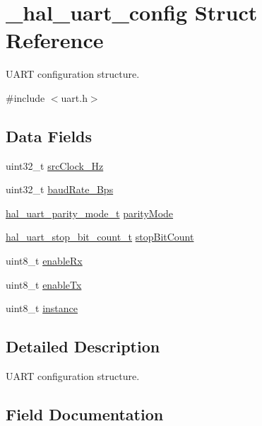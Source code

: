 \hypertarget{struct__hal__uart__config}{}\section{\+\_\+hal\+\_\+uart\+\_\+config Struct Reference}
\label{struct__hal__uart__config}


U\+A\+RT configuration structure.  




{\ttfamily \#include $<$uart.\+h$>$}

\subsection*{Data Fields}
\begin{DoxyCompactItemize}
\item 
uint32\+\_\+t \mbox{\hyperlink{struct__hal__uart__config_a91ed494cee19d1629ac4e017ce45ddbb}{src\+Clock\+\_\+\+Hz}}
\item 
uint32\+\_\+t \mbox{\hyperlink{struct__hal__uart__config_aa5df547b4cb95d3c959373cf6fa672b5}{baud\+Rate\+\_\+\+Bps}}
\item 
\mbox{\hyperlink{group___u_a_r_t___adapter_ga24029165f252c4fe925cdb8af52b3b8f}{hal\+\_\+uart\+\_\+parity\+\_\+mode\+\_\+t}} \mbox{\hyperlink{struct__hal__uart__config_acbc3e2332cc7a0602c77932e67db0b6f}{parity\+Mode}}
\item 
\mbox{\hyperlink{group___u_a_r_t___adapter_gad0fc800e49978f5aee5c162009b16bdb}{hal\+\_\+uart\+\_\+stop\+\_\+bit\+\_\+count\+\_\+t}} \mbox{\hyperlink{struct__hal__uart__config_a9cd9931237993b857304ad7dc515676f}{stop\+Bit\+Count}}
\item 
uint8\+\_\+t \mbox{\hyperlink{struct__hal__uart__config_aa71c95a745f5bb5f666e55f7c98e4e9f}{enable\+Rx}}
\item 
uint8\+\_\+t \mbox{\hyperlink{struct__hal__uart__config_a4e1a6dc4f40cf76369024809e1f4163d}{enable\+Tx}}
\item 
uint8\+\_\+t \mbox{\hyperlink{struct__hal__uart__config_a0247bf27ecd553eeb029a06b1e6ec354}{instance}}
\end{DoxyCompactItemize}


\subsection{Detailed Description}
U\+A\+RT configuration structure. 

\subsection{Field Documentation}
\mbox{\label{struct__hal__uart__config_aa5df547b4cb95d3c959373cf6fa672b5}} 
